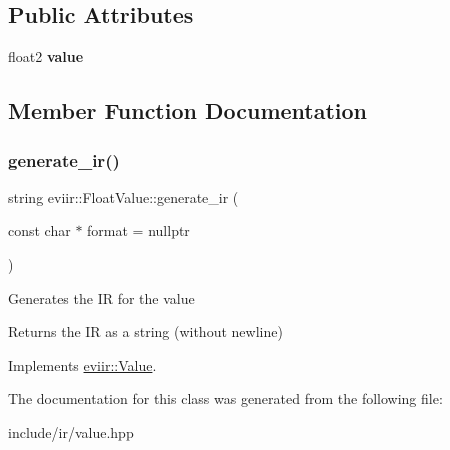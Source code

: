 \subsection*{Public Attributes}
\begin{DoxyCompactItemize}
\item 
\mbox{\label{classeviir_1_1FloatValue_a358648f87126c79adda8949f272fb56d}} 
float2 {\bfseries value}
\end{DoxyCompactItemize}


\subsection{Member Function Documentation}
\mbox{\label{classeviir_1_1FloatValue_a8713d6eb43445ba56c4104bce8fe7070}} 
\subsubsection{\texorpdfstring{generate\+\_\+ir()}{generate\_ir()}}
{\footnotesize\ttfamily string eviir\+::\+Float\+Value\+::generate\+\_\+ir (\begin{DoxyParamCaption}\item[{const char $\ast$}]{format = {\ttfamily nullptr} }\end{DoxyParamCaption})\hspace{0.3cm}{\ttfamily [virtual]}}

Generates the IR for the value \begin{DoxyReturn}{Returns}
the IR as a string (without newline) 
\end{DoxyReturn}


Implements \hyperlink{classeviir_1_1Value_a0613bf660425df31e230681555f64dea}{eviir\+::\+Value}.



The documentation for this class was generated from the following file\+:\begin{DoxyCompactItemize}
\item 
include/ir/value.\+hpp\end{DoxyCompactItemize}
